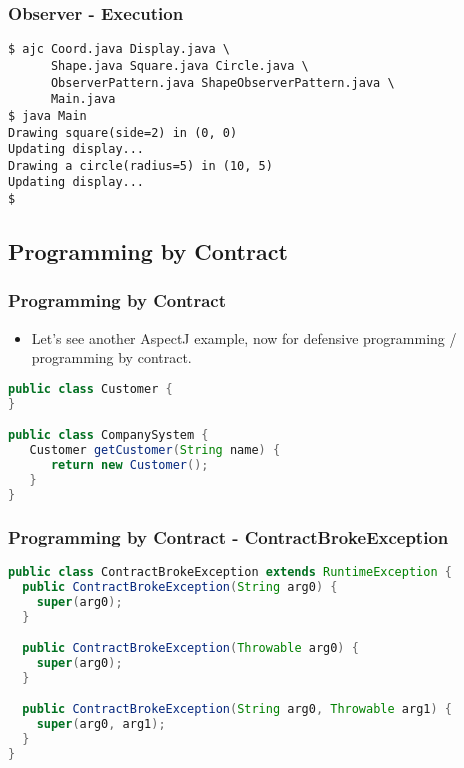 \documentclass[11pt]{beamer}
\begin{document}
\begin{frame}[fragile]
   \frametitle{Observer - Execution}
   {\scriptsize
\begin{lstlisting}
$ ajc Coord.java Display.java \
      Shape.java Square.java Circle.java \
      ObserverPattern.java ShapeObserverPattern.java \
      Main.java
$ java Main
Drawing square(side=2) in (0, 0)
Updating display...
Drawing a circle(radius=5) in (10, 5)
Updating display...
$
\end{lstlisting}
   }
\end{frame}

\subsection*{Programming by Contract}

\begin{frame}[fragile]
   \frametitle{Programming by Contract}
   \begin{itemize}
      \item Let's see another AspectJ example, now for defensive programming / programming by contract.
   \end{itemize}
   {\scriptsize
   \begin{lstlisting}[language=java]
public class Customer {
}

public class CompanySystem {
   Customer getCustomer(String name) {
      return new Customer();
   }
}
   \end{lstlisting}}
   
\end{frame}

\begin{frame}[fragile]
   \frametitle{Programming by Contract - ContractBrokeException}
{\scriptsize
\begin{lstlisting}[language=java]
public class ContractBrokeException extends RuntimeException {
  public ContractBrokeException(String arg0) {
    super(arg0);
  }

  public ContractBrokeException(Throwable arg0) {
    super(arg0);
  }

  public ContractBrokeException(String arg0, Throwable arg1) {
    super(arg0, arg1);
  }
}
\end{lstlisting}}
\end{frame}
\end{document}
